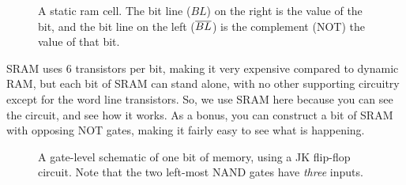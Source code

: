 \begin{figure}[h!]
\begin{center}

\caption{A static ram cell. The bit line ($BL$) on the right is the value of the bit, and the bit line on the left ($\overline{BL}$) is the complement (NOT) the value of that bit.} %
\label{fig:sram}
\end{center}
\end{figure}

SRAM uses 6 transistors per bit, making it very expensive compared to dynamic RAM, 
but each bit of SRAM can stand alone, with no other supporting circuitry except 
for the word line transistors. So, we use SRAM here because you can see the 
circuit, and see how it works. As a bonus, you can construct a bit of SRAM with 
opposing NOT gates, making it fairly easy to see what is happening.

\begin{figure}
  \begin{center}
  
  \caption{A gate-level schematic of one bit of memory, using a JK flip-flop circuit. Note that the two left-most NAND gates have \emph{three} inputs.}
  \end{center}
\end{figure}



